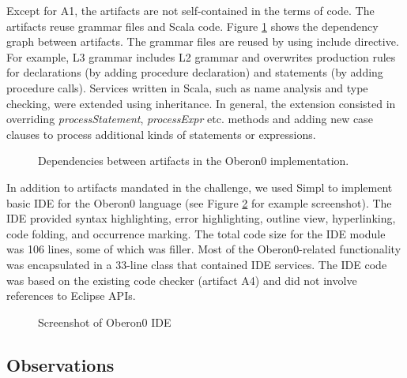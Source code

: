 Except for A1, the artifacts are not self-contained in the terms of
code. The artifacts reuse grammar files and Scala code. Figure \ref{fig:artifact-dependencies}
shows the dependency graph between artifacts. The grammar files are
reused by using include directive. For example, L3 grammar includes
L2 grammar and overwrites production rules for declarations (by adding
procedure declaration) and statements (by adding procedure calls).
Services written in Scala, such as name analysis and type checking,
were extended using inheritance. In general, the extension consisted
in overriding \emph{processStatement}, \emph{processExpr} etc. methods
and adding new case clauses to process additional kinds of statements
or expressions.

%
\begin{figure}[!h]
\noindent \begin{centering}
\par\end{centering}

\caption{\label{fig:artifact-dependencies}Dependencies between artifacts in
the Oberon0 implementation.}

\end{figure}


In addition to artifacts mandated in the challenge, we used Simpl
to implement basic IDE for the Oberon0 language (see Figure \ref{fig:Screenshot-of-Oberon0}
for example screenshot). The IDE provided syntax highlighting, error
highlighting, outline view, hyperlinking, code folding, and occurrence
marking. The total code size for the IDE module was 106 lines, some
of which was filler. Most of the Oberon0-related functionality was
encapsulated in a 33-line class that contained IDE services. The IDE
code was based on the existing code checker (artifact A4) and did
not involve references to Eclipse APIs. 

%
\begin{figure}[!h]

\caption{\label{fig:Screenshot-of-Oberon0}Screenshot of Oberon0 IDE}

\end{figure}





\subsection{Observations}

